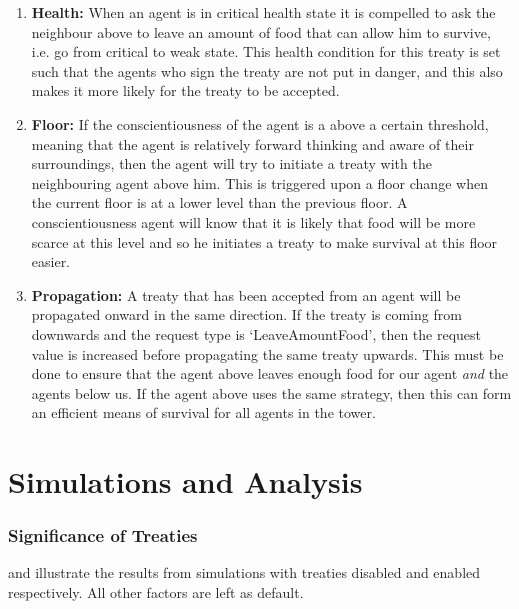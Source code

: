 \begin{enumerate}
    \item \textbf{Health:} When an agent is in critical health state it is compelled to ask the neighbour above to leave an amount of food that can allow him to survive, i.e. go from critical to weak state. This health condition for this treaty is set such that the agents who sign the treaty are not put in danger, and this also makes it more likely for the treaty to be accepted.
    
    \item \textbf{Floor:} If the conscientiousness of the agent is a above a certain threshold, meaning that the agent is relatively forward thinking and aware of their surroundings, then the agent will try to initiate a treaty with the neighbouring agent above him. This is triggered upon a floor change when the current floor is at a lower level than the previous floor. A conscientiousness agent will know that it is likely that food will be more scarce at this level and so he initiates a treaty to make survival at this floor easier.

    \item \textbf{Propagation:} A treaty that has been accepted from an agent will be propagated onward in the same direction. If the treaty is coming from downwards and the request type is `LeaveAmountFood', then the request value is increased before propagating the same treaty upwards. This must be done to ensure that the agent above leaves enough food for our agent \textit{and} the agents below us. If the agent above uses the same strategy, then this can form an efficient means of survival for all agents in the tower.
\end{enumerate}

\section{Simulations and Analysis}
\subsubsection{Significance of Treaties}
\label{sec: Simulations and Analysis}
 and  illustrate the results from simulations with treaties disabled and enabled respectively. All other factors are left as default.

